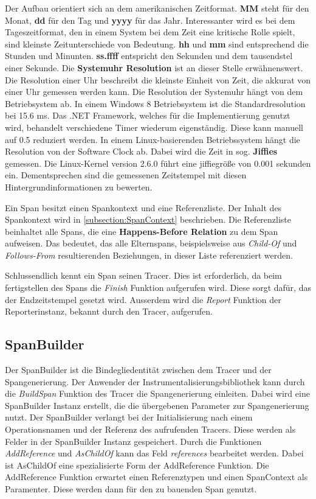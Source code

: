 Der Aufbau orientiert sich an dem amerikanischen Zeitformat. \textbf{MM} steht für den Monat, \textbf{dd} für den Tag und \textbf{yyyy} für das Jahr. Interessanter wird es bei dem Tageszeitformat, den in einem System bei dem Zeit eine kritische Rolle spielt, sind kleinste Zeitunterschiede von Bedeutung. \textbf{hh} und \textbf{mm} sind entsprechend die Stunden und Minunten. \textbf{ss.ffff} entspricht den Sekunden und dem tausendstel einer Sekunde. Die \textbf{Systemuhr Resolution} ist an dieser Stelle erwähnenswert. Die Resolution einer Uhr beschreibt die kleinste Einheit von Zeit, die akkurat von einer Uhr gemessen werden kann. Die Resolution der Systemuhr hängt von dem Betriebsystem ab. In einem Windows 8  Betriebsystem ist die Standardresolution bei 15.6 ms. Das .NET Framework, welches für die Implementierung genutzt wird, behandelt verschiedene Timer wiederum eigenständig. Diese kann manuell auf 0.5 reduziert werden. In einem Linux-basierenden Betriebssystem hängt die Resolution von der Software Clock ab. Dabei wird die Zeit in sog. \textbf{Jiffies} gemessen. Die Linux-Kernel version 2.6.0 führt eine jiffiegröße von 0.001 sekunden ein. Dementsprechen sind die gemessenen Zeitstempel mit diesen Hintergrundinformationen zu bewerten.

Ein Span besitzt einen Spankontext und eine Referenzliste. Der Inhalt des Spankontext wird in \cref{subsection:SpanContext} beschrieben. Die Referenzliste beinhaltet alle Spans, die eine \textbf{Happens-Before Relation} zu dem Span aufweisen. Das bedeutet, das alle Elternspans, beispielsweise aus \emph{Child-Of} und \emph{Follows-From} resultierenden Beziehungen, in dieser Liste referenziert werden.

Schlussendlich kennt ein Span seinen Tracer. Dies ist erforderlich, da beim fertigstellen des Spans die \emph{Finish} Funktion aufgerufen wird. Diese sorgt dafür, das der Endzeitstempel gesetzt wird. Ausserdem wird die \emph{Report} Funktion der Reporterinstanz, bekannt durch den Tracer, aufgerufen.

\subsection{SpanBuilder}
\label{subsection:SpanBuilder}

Der SpanBuilder ist die Bindegliedentität zwischen dem Tracer und der Spangenerierung. Der Anwender der Instrumentalisierungsbibliothek kann durch die \emph{BuildSpan} Funktion des Tracer die Spangenerierung einleiten. Dabei wird eine SpanBuilder Instanz erstellt, die die übergebenen Parameter zur Spangenerierung nutzt. Der SpanBuilder verlangt bei der Initialisierung nach einem Operationsnamen und der Referenz des aufrufenden Tracers. Diese werden als Felder in der SpanBuilder Instanz gespeichert. Durch die Funktionen \emph{AddReference} und \emph{AsChildOf} kann das Feld \emph{references} bearbeitet werden. Dabei ist AsChildOf eine spezialisierte Form der AddReference Funktion. Die AddReference Funktion erwartet einen Referenztypen und einen SpanContext als Paramenter. Diese werden dann für den zu bauenden Span genutzt. 

